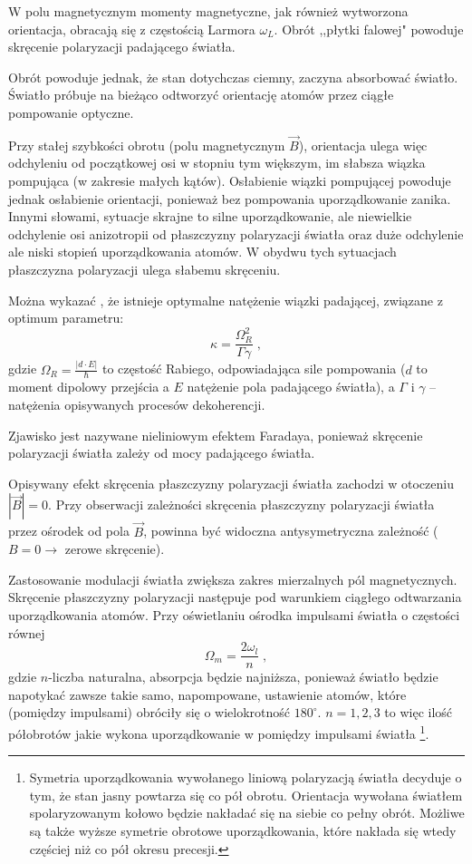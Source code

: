 \documentclass[a4paper,10pt,twoside]{report}
\begin{document}
W polu magnetycznym momenty magnetyczne, jak również wytworzona orientacja, obracają się z częstością Larmora $\omega_L$. Obrót ,,płytki falowej" powoduje skręcenie polaryzacji padającego światła.

Obrót powoduje jednak, że stan dotychczas ciemny, zaczyna absorbować światło. Światło próbuje na bieżąco odtworzyć orientację atomów przez ciągłe pompowanie optyczne.

Przy stałej szybkości obrotu (polu magnetycznym $\vec B$), orientacja ulega więc odchyleniu od początkowej osi w stopniu tym większym, im słabsza wiązka pompująca (w zakresie małych kątów). Osłabienie wiązki pompującej powoduje jednak osłabienie orientacji, ponieważ bez pompowania uporządkowanie zanika. Innymi słowami, sytuacje skrajne to silne uporządkowanie, ale niewielkie odchylenie osi anizotropii od płaszczyzny polaryzacji światła oraz duże odchylenie ale niski stopień uporządkowania atomów. W obydwu tych sytuacjach płaszczyzna polaryzacji ulega słabemu skręceniu.

Można wykazać \cite{srivansan}, że istnieje optymalne natężenie wiązki padającej, związane z optimum parametru:
\begin{equation}
\kappa=\frac{\Omega_R^2}{\Gamma\gamma} \; ,
\end{equation}
gdzie $\Omega_R=\frac{|d \cdot E|}{\hbar}$ to częstość Rabiego, odpowiadająca sile pompowania ($d$ to moment dipolowy przejścia a $E$ natężenie pola padającego światła), a $\Gamma$ i $\gamma$ -- natężenia opisywanych procesów dekoherencji.

Zjawisko jest nazywane nieliniowym efektem Faradaya, ponieważ skręcenie polaryzacji światła zależy od mocy padającego światła.

Opisywany efekt skręcenia płaszczyzny polaryzacji światła zachodzi w otoczeniu $|\vec B|=0$. Przy obserwacji zależności skręcenia płaszczyzny polaryzacji światła przez ośrodek od pola $\vec B$, powinna być widoczna antysymetryczna zależność ($B=0\rightarrow$ zerowe skręcenie).

 Zastosowanie modulacji światła zwiększa zakres mierzalnych pól magnetycznych. Skręcenie płaszczyzny polaryzacji następuje pod warunkiem ciągłego odtwarzania uporządkowania atomów. Przy oświetlaniu ośrodka impulsami światła o częstości równej
\begin{equation}
\Omega_m=\frac{2 \omega_l}{n} \; ,
\end{equation}
gdzie $n$-liczba naturalna, absorpcja będzie najniższa, ponieważ światło będzie napotykać zawsze takie samo, napompowane, ustawienie atomów, które (pomiędzy impulsami) obróciły się o wielokrotność $180^{\circ}$.  $n=1,2,3$ to więc ilość półobrotów jakie wykona uporządkowanie w pomiędzy impulsami światła \footnote{Symetria uporządkowania wywołanego liniową polaryzacją światła decyduje o tym, że stan jasny powtarza się co pół obrotu. Orientacja wywołana światłem spolaryzowanym kołowo będzie nakładać się na siebie co pełny obrót. Możliwe są także wyższe symetrie obrotowe uporządkowania, które nakłada się wtedy częściej niż co pół okresu precesji.}.
\end{document}
